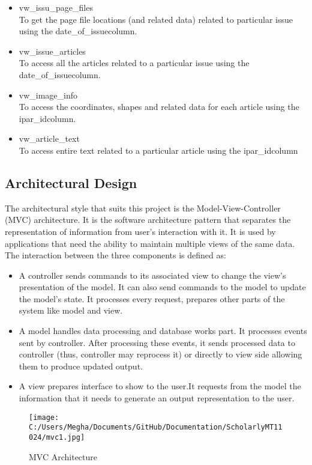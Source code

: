 \documentclass[amsart, 12pt]{article}
\begin{document}
\begin{itemize}
\item vw\_issu\_page\_files \\
To get the page file locations (and related data) related to particular issue using the \textasciigrave date\_of\_issue\textasciiacute column.

\item vw\_issue\_articles \\
To access all the articles related to a particular issue using the \textasciigrave date\_of\_issue\textasciiacute column.

\item vw\_image\_info \\
To access the coordinates, shapes and related data for each article using the \textasciigrave ipar\_id\textasciiacute column.

\item vw\_article\_text \\
To access entire text related to a particular article using the \textasciigrave ipar\_id\textasciiacute column
\end{itemize}
\subsection{Architectural Design}
The architectural style that suits this project is the Model-View-Controller (MVC) architecture. It is the software architecture pattern that separates the representation of information from user's interaction with it. It is used by applications that need the ability to maintain multiple views of the same data. The interaction between the three components is defined as: \\

\begin{itemize}
\item A controller sends commands to its associated view to change the view's presentation of the model. It can also send commands to the model to update the model's state. It processes every request, prepares other parts of the system like model and view.

\item A model handles data processing and database works part. It processes events sent by controller. After processing these events, it sends processed data to controller (thus, controller may reprocess it) or directly to view side allowing them to produce updated output.

\item A view prepares interface to show to the user.It requests from the model the information that it needs to generate an output representation to the user.\\
\end{itemize}
\begin{figure}[ht!]
\centering
\texttt{[image: C:/Users/Megha/Documents/GitHub/Documentation/ScholarlyMT11024/mvc1.jpg]}
\caption{MVC Architecture}
\label{fig:Phase 2}
\end{figure}
\end{document}
